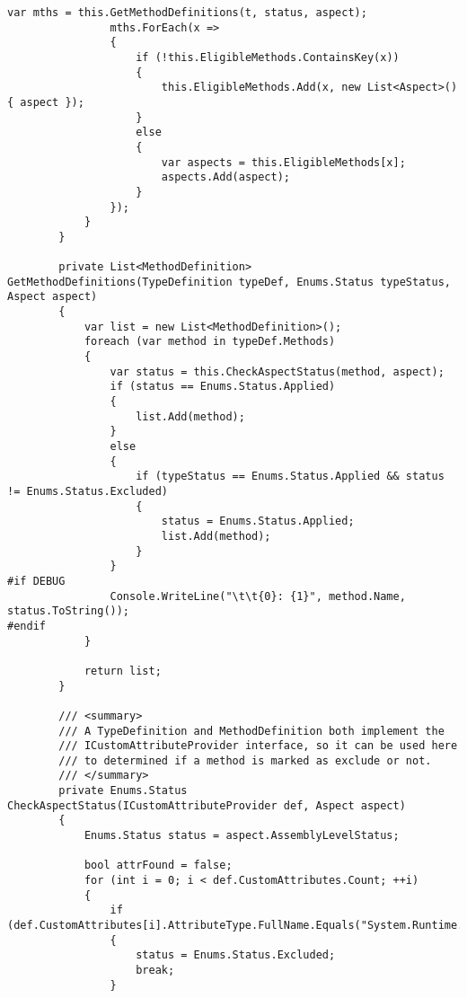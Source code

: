 \begin{lstlisting}[caption={../buffalo/Weaver.cs}, label=../buffalo/Weaver.cs, frame=tb, basicstyle=\scriptsize]
                var mths = this.GetMethodDefinitions(t, status, aspect);
                mths.ForEach(x =>
                {
                    if (!this.EligibleMethods.ContainsKey(x))
                    {
                        this.EligibleMethods.Add(x, new List<Aspect>() { aspect });
                    }
                    else
                    {
                        var aspects = this.EligibleMethods[x];
                        aspects.Add(aspect);
                    }
                });
            }
        }

        private List<MethodDefinition> GetMethodDefinitions(TypeDefinition typeDef, Enums.Status typeStatus, Aspect aspect)
        {
            var list = new List<MethodDefinition>();
            foreach (var method in typeDef.Methods)
            {
                var status = this.CheckAspectStatus(method, aspect);
                if (status == Enums.Status.Applied)
                {
                    list.Add(method);
                }
                else
                {
                    if (typeStatus == Enums.Status.Applied && status != Enums.Status.Excluded)
                    {
                        status = Enums.Status.Applied;
                        list.Add(method);
                    }
                }
#if DEBUG
                Console.WriteLine("\t\t{0}: {1}", method.Name, status.ToString());
#endif
            }

            return list;
        }

        /// <summary>
        /// A TypeDefinition and MethodDefinition both implement the
        /// ICustomAttributeProvider interface, so it can be used here
        /// to determined if a method is marked as exclude or not.
        /// </summary>
        private Enums.Status CheckAspectStatus(ICustomAttributeProvider def, Aspect aspect)
        {
            Enums.Status status = aspect.AssemblyLevelStatus;

            bool attrFound = false;
            for (int i = 0; i < def.CustomAttributes.Count; ++i)
            {
                if (def.CustomAttributes[i].AttributeType.FullName.Equals("System.Runtime.CompilerServices.CompilerGeneratedAttribute"))
                {
                    status = Enums.Status.Excluded;
                    break;
                }


\end{lstlisting}
